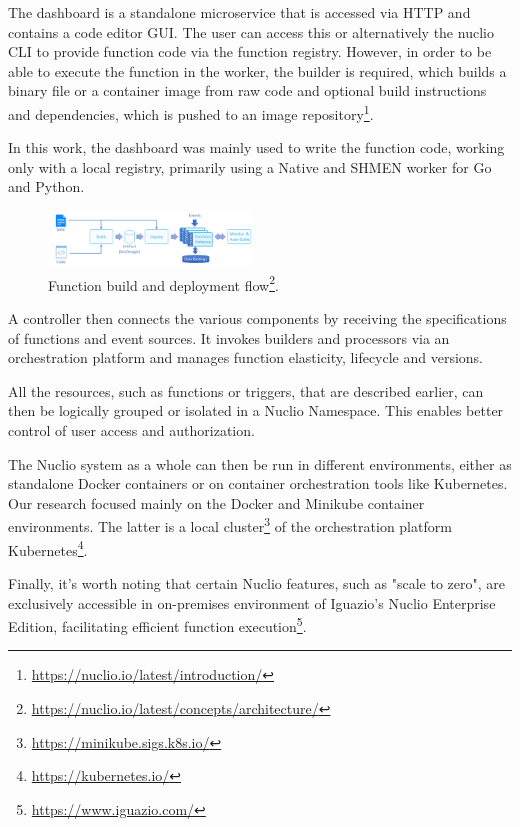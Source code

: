The dashboard is a standalone microservice that is accessed via HTTP and contains a code editor GUI. The user can access this or alternatively the nuclio CLI to provide function code via the function registry. However, in order to be able to execute the function in the worker, the builder is required, which builds a binary file or a container image from raw code and optional build instructions and dependencies, which is pushed to an image repository\footnote{\url{https://nuclio.io/latest/introduction/}}.

In this work, the dashboard was mainly used to write the function code, working only with a local registry, primarily using a Native and SHMEN worker for Go and Python. 

\begin{figure}
    \centering
    \includegraphics[width=0.48\textwidth]{figures/profaastinate/nuclio-build-deploy.png} 
    \caption{
         Function build and deployment flow\protect\footnote{\url{https://nuclio.io/latest/concepts/architecture/}}.
    }
    \label{fig:nuclio-build-deploy}
\end{figure}

A controller then connects the various components by receiving the specifications of functions and event sources. It invokes builders and processors via an orchestration platform and manages function elasticity, lifecycle and versions.

\label{sec:nuclio-namespace}
All the resources, such as functions or triggers, that are described earlier, can then be logically grouped or isolated in a Nuclio Namespace. This enables better control of user access and authorization. 

The Nuclio system as a whole can then be run in different environments, either as standalone Docker containers or on container orchestration tools like Kubernetes. Our research focused mainly on the Docker and Minikube container environments. The latter is a local cluster\footnote{\url{https://minikube.sigs.k8s.io/}} of the orchestration platform Kubernetes\footnote{\url{https://kubernetes.io/}}. 

Finally, it's worth noting that certain Nuclio features, such as "scale to zero", are exclusively accessible in on-premises environment of Iguazio's Nuclio Enterprise Edition, facilitating efficient function execution\footnote{\url{https://www.iguazio.com/}}.